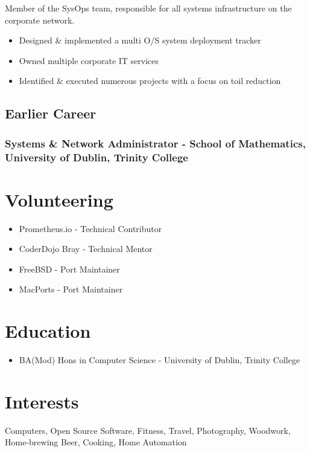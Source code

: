 \documentclass[a4paper, 10pt] {article}
\begin{document}
Member of the SysOps team, responsible for all systems infrastructure on
the corporate network.

\begin{itemize}
	\item Designed \& implemented a multi O/S system deployment tracker
	\item Owned multiple corporate IT services
	\item Identified \& executed numerous projects with a focus on toil reduction
\end{itemize}

\subsection*{Earlier Career}

\subsubsection*{Systems \& Network Administrator - School of Mathematics, University of Dublin, Trinity College}

\hrulefill

\section*{Volunteering}

\begin{itemize}
  \item Prometheus.io - Technical Contributor
  \item CoderDojo Bray - Technical Mentor
  \item FreeBSD - Port Maintainer
  \item MacPorts - Port Maintainer
\end{itemize}

\hrulefill

\section*{Education}

\begin{itemize}
  \item BA(Mod) Hons in Computer Science - University of Dublin, Trinity College
\end{itemize}

\hrulefill

\section*{Interests}

Computers, Open Source Software, Fitness, Travel, Photography, Woodwork,
Home-brewing Beer, Cooking, Home Automation
\end{document}
